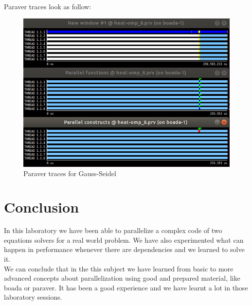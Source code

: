 \documentclass[12]{article}
\begin{document}
Paraver traces look as follow:
\begin{figure}[H]
    \centering
    \includegraphics[scale=0.50]{images/gaussParaver.PNG}
    \caption{Paraver traces for Gauss-Seidel}
    \label{scalability_gauss}
\end{figure}

\section{Conclusion}
In this laboratory we have been able to parallelize a complex code of two equations solvers for a real world problem. We have also experimented what can happen in performance whenever there are dependencies and we learned to solve it.
\\

We can conclude that in the this subject we have learned from basic to more advanced concepts about parallelization using good and prepared material, like boada or paraver. It has been a good experience and we have learnt a lot in those laboratory sessions. 
\end{document}
